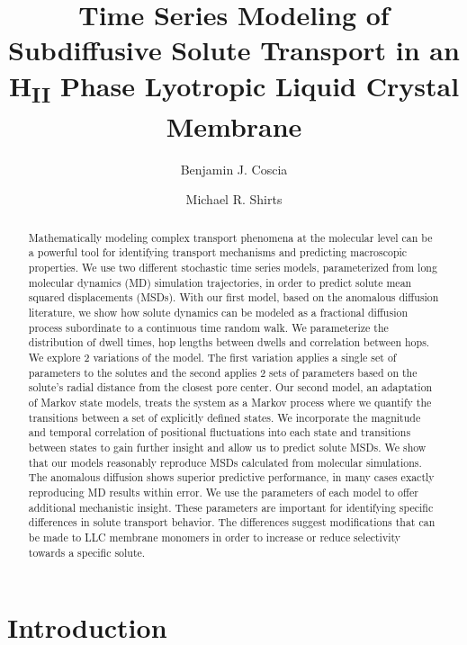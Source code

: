 \documentclass{article}
\title{Time Series Modeling of Subdiffusive Solute Transport in an H\textsubscript{II} Phase Lyotropic Liquid Crystal Membrane}
\author{Benjamin J. Coscia \and Michael R. Shirts}
\begin{document}
  \graphicspath{{./figures/}}
  \maketitle
  
  \begin{abstract}
  
  Mathematically modeling complex transport phenomena at the molecular level 
  can be a powerful tool for identifying transport mechanisms and predicting
  macroscopic properties. We use two different stochastic time series models,
  parameterized from long molecular dynamics (MD) simulation trajectories, in order
  to predict solute mean squared displacements (MSDs). With our first model, based
  on the anomalous diffusion literature, we show how solute dynamics can be modeled as
  a fractional diffusion process subordinate to a continuous time random walk.
  We parameterize the distribution of dwell times, hop lengths between dwells and
  correlation between hops. We explore 2 variations of the model. The first variation
  applies a single set of parameters to the solutes and the second applies 2 sets
  of parameters based on the solute's radial distance from the closest pore center.
  Our second model, an adaptation of Markov state models, treats the system
  as a Markov process where we quantify the transitions between a set of 
  explicitly defined states. We incorporate the magnitude and temporal correlation
  of positional fluctuations into each state and transitions between states to gain
  further insight and allow us to predict solute MSDs. We show that our models 
  reasonably reproduce MSDs calculated from molecular simulations. The anomalous 
  diffusion shows superior predictive performance, in many cases exactly reproducing
  MD results within error. We use the parameters of each model to offer additional mechanistic
  insight. These parameters are important for identifying specific differences in 
  solute transport behavior. The differences suggest modifications that can be
  made to LLC membrane monomers in order to increase or reduce selectivity towards a 
  specific solute.
  
  \end{abstract}

  \section{Introduction}
\end{document}
